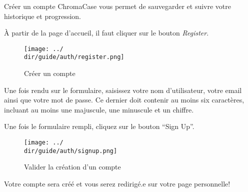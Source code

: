 Créer un compte ChromaCase vous permet de sauvegarder et suivre votre historique et progression.

À partir de la page d’accueil, il faut cliquer sur le bouton \textit{Register}.

\begin{figure}[H]
	\texttt{[image: ../\\dir/guide/auth/register.png]}
	\caption{Créer un compte}
\end{figure}

Une fois rendu sur le formulaire, saisissez votre nom d’utilisateur, votre email ainsi que votre mot de passe.
Ce dernier doit contenir au moins six caractères, incluant au moins une majuscule, une minuscule et un chiffre.

Une fois le formulaire rempli, cliquez sur le bouton “Sign Up”.

\begin{figure}[H]
	\begin{center}
		\texttt{[image: ../\\dir/guide/auth/signup.png]}
		\caption{Valider la création d'un compte}
	\end{center}
\end{figure}

Votre compte sera créé et vous serez redirigé.e sur votre page personnelle!